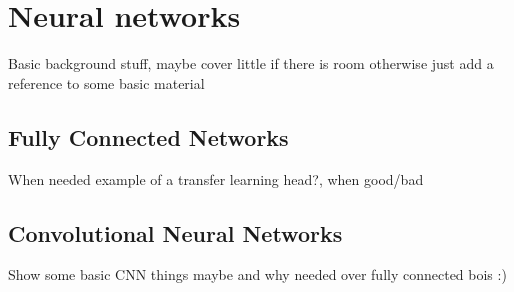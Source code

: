 \chapter{Neural networks}
Basic background stuff, maybe cover little if there is room otherwise just add a reference to some basic material
\section{Fully Connected Networks}
When needed example of a transfer learning head?, when good/bad
\section{Convolutional Neural Networks}
Show some basic CNN things maybe and why needed over fully connected bois :)